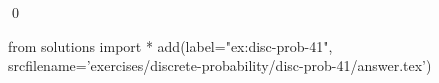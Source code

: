 
\begin{ex} 
  \label{ex:disc-prob-41}
  
  \qed
\end{ex} 
\begin{python0}
from solutions import *
add(label="ex:disc-prob-41",
    srcfilename='exercises/discrete-probability/disc-prob-41/answer.tex') 
\end{python0}
